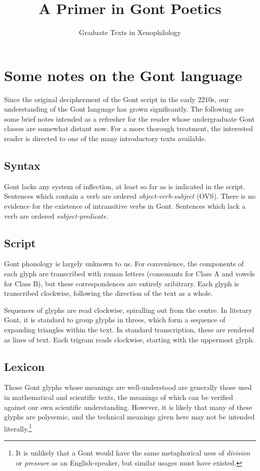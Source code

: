 \documentclass[ebook, 9pt, openany]{memoir}
\title{A Primer in Gont Poetics}
\author{Graduate Texts in Xenophilology}
\date{}
\begin{document}
\maketitle
\clearpage
{}
\tableofcontents

\chapter{Some notes on the Gont language}

Since the original decipherment of the Gont script in the early 2210s, our
understanding of the Gont language has grown significantly. The following are
some brief notes intended as a refresher for the reader whose undergraduate
Gont classes are somewhat distant now. For a more thorough treatment, the
interested reader is directed to one of the many introductory texts available.

\section{Syntax}

Gont lacks any system of inflection, at least so far as is indicated in the
script. Sentences which contain a verb are ordered \emph{object-verb-subject}
(OVS). There is no evidence for the existence of intransitive verbs in Gont.
Sentences which lack a verb are ordered \emph{subject-predicate}.

\section{Script}

Gont phonology is largely unknown to us. For convenience, the components of
each glyph are transcribed with roman letters (consonants for Class A and
vowels for Class B), but these correspondences are entirely aribitrary. Each
glyph is transcribed clockwise, following the direction of the text as a whole.

Sequences of glyphs are read clockwise, spiralling out from the centre. In
literary Gont, it is standard to group glyphs in threes, which form a sequence
of expanding triangles within the text. In standard transcription, these are
rendered as lines of text. Each trigram reads clockwise, starting with the
uppermost glyph.

\section{Lexicon}

Those Gont glyphs whose meanings are well-understood are generally those used
in mathematical and scientific texts, the meanings of which can be verified
against our own scientific understanding. However, it is likely that many of
these glyphs are polysemic, and the technical meanings given here may not be
intended literally.\footnote{It is unlikely that a Gont would have the same
metaphorical uses of \emph{division} or \emph{pressure} as an English-speaker,
but similar usages must have existed.}



\end{document}
